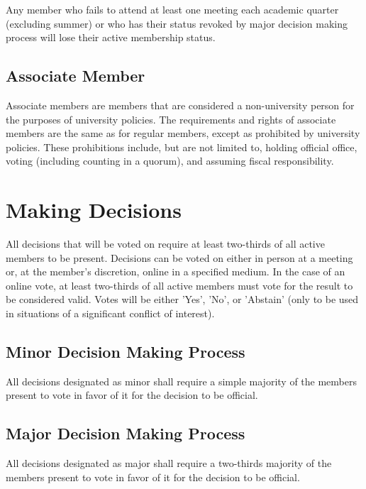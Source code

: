\documentclass{article}
\begin{document}
Any member who fails to attend at least one meeting each academic quarter
(excluding summer) or who has their status revoked by major decision making
process will lose their active membership status.

\subsection{Associate Member}

Associate members are members that are considered a non-university person for 
the purposes of university policies.  The requirements and rights of associate 
members are the same as for regular members, except as prohibited by university
policies. These prohibitions include, but are not limited to, holding official
office, voting (including counting in a quorum), and assuming fiscal responsibility.


\section{Making Decisions}


All decisions that will be voted on require at least two-thirds of all active members
to be present. Decisions can be voted on either in person at a meeting or, at the
member's discretion, online in a specified medium. In the case of an online vote,
at least two-thirds of all active members must vote for the result to be considered valid.
Votes will be either 'Yes', 'No', or 'Abstain' (only to be used in situations of a significant
conflict of interest).

\subsection{Minor Decision Making Process}

All decisions designated as minor shall require a simple majority of the members present
to vote in favor of it for the decision to be official.

\subsection{Major Decision Making Process}

All decisions designated as major shall require a two-thirds majority of the members present
to vote in favor of it for the decision to be official.
\end{document}
